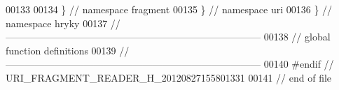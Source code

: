 \begin{DoxyCode}
00133 
00134 \} \textcolor{comment}{// namespace fragment}
00135 \} \textcolor{comment}{// namespace uri}
00136 \} \textcolor{comment}{// namespace hryky}
00137 \textcolor{comment}{//
      ------------------------------------------------------------------------------}
00138 \textcolor{comment}{// global function definitions}
00139 \textcolor{comment}{//
      ------------------------------------------------------------------------------}
00140 \textcolor{preprocessor}{#endif // URI\_FRAGMENT\_READER\_H\_20120827155801331}
00141 \textcolor{preprocessor}{}\textcolor{comment}{// end of file}
\end{DoxyCode}
